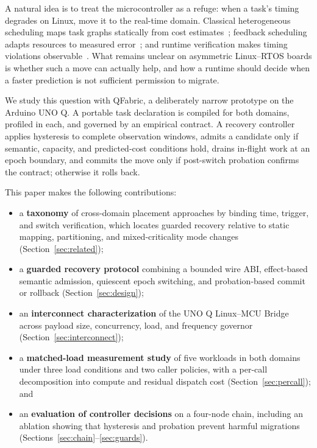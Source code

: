 \documentclass[conference]{IEEEtran}
\newcommand{\system}{QFabric\xspace}
\begin{document}
A natural idea is to treat the microcontroller as a refuge: when a task's
timing degrades on Linux, move it to the real-time domain. Classical
heterogeneous scheduling maps task graphs statically from cost
estimates~\cite{topcuoglu2002heft}; feedback scheduling adapts resources to
measured error~\cite{lu2002feedback}; and runtime verification makes timing
violations observable~\cite{reinbacher2014runtime,nandi2015contracts}. What
remains unclear on asymmetric Linux--RTOS boards is whether such a move can
actually help, and how a runtime should decide when a faster prediction is not
sufficient permission to migrate.

We study this question with \system, a deliberately narrow prototype on the
Arduino UNO Q. A portable task declaration is compiled for both domains,
profiled in each, and governed by an empirical contract. A recovery controller
applies hysteresis to complete observation windows, admits a candidate only if
semantic, capacity, and predicted-cost conditions hold, drains in-flight work
at an epoch boundary, and commits the move only if post-switch probation
confirms the contract; otherwise it rolls back.

This paper makes the following contributions:
\begin{itemize}
  \item a \textbf{taxonomy} of cross-domain placement approaches by binding
  time, trigger, and switch verification, which locates guarded recovery
  relative to static mapping, partitioning, and mixed-criticality mode
  changes (Section~\ref{sec:related});
  \item a \textbf{guarded recovery protocol} combining a bounded wire ABI,
  effect-based semantic admission, quiescent epoch switching, and
  probation-based commit or rollback (Section~\ref{sec:design});
  \item an \textbf{interconnect characterization} of the UNO Q Linux--MCU
  Bridge across payload size, concurrency, load, and frequency governor
  (Section~\ref{sec:interconnect});
  \item a \textbf{matched-load measurement study} of five workloads in both
  domains under three load conditions and two caller policies, with a
  per-call decomposition into compute and residual dispatch cost
  (Section~\ref{sec:percall}); and
  \item an \textbf{evaluation of controller decisions} on a four-node chain,
  including an ablation showing that hysteresis and probation prevent harmful
  migrations (Sections~\ref{sec:chain}--\ref{sec:guards}).
\end{itemize}
\end{document}
